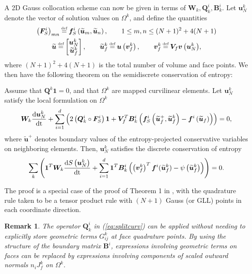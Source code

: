 \documentclass[review,onefignum,onetabnum,final]{siamart171218}
\newtheorem*{remark}{Remark}
\renewcommand{\tilde}{\widetilde}
\newcommand{\td}[2]{\frac{{\rm d}#1}{{\rm d}{\rm #2}}}
\newcommand{\LRp}[1]{\left( #1 \right)}
\newcommand\myeq{\mathrel{\stackrel{\makebox[0pt]{\mbox{\normalfont\tiny def}}}{=}}}
\begin{document}
A 2D Gauss collocation scheme can now be given in terms of $\bm{W}_k, \bm{Q}^i_k, \bm{B}^i_k$.   Let $\bm{u}^k_N$ denote the vector of solution values on $\Omega^k$, and define the quantities 
\begin{gather*}
\LRp{\bm{F}^i_S}_{mn} \myeq \bm{f}^i_S\LRp{\tilde{\bm{u}}_m,\tilde{\bm{u}}_n}, \qquad 1 \leq m,n \leq (N+1)^2 + 4(N+1) \\
\tilde{\bm{u}} \myeq \begin{bmatrix}
\bm{u}^k_N\\
\tilde{\bm{u}}^k_f
\end{bmatrix}, \qquad \tilde{\bm{u}}^k_f \myeq \bm{u}\LRp{\bm{v}^k_f}, \qquad 
\bm{v}^k_f \myeq {\bm{V}_f\bm{v}\LRp{\bm{u}^k_N}},
\end{gather*}
where $(N+1)^2 + 4(N+1)$ is the total number of volume and face points.  
We then have the following theorem on the semidiscrete conservation of entropy:
\begin{theorem}
\label{thm:esdg2d}
Assume that $\bm{Q}^k\bm{1} = 0$, and that $\Omega^k$ are mapped curvilinear elements.  Let $\bm{u}^k_N$ satisfy the local formulation on $\Omega^k$
\begin{equation}
{\bm{W}_k\td{\bm{u}^k_N}{t} + \sum_{i=1}^d \LRp{2\LRp{\bm{Q}^i_k\circ\bm{F}^i_S}\bm{1} + \bm{V}_f^T\bm{B}_k^i\LRp{\bm{f}^i_S\LRp{{\tilde{\bm{u}}_f}^+,\tilde{\bm{u}}^k_f}-\bm{f}^i\LRp{\tilde{\bm{u}}_f}}}} = 0, 
\end{equation}
where $\tilde{\bm{u}}^+$ denotes boundary values of the entropy-projected conservative variables on neighboring elements.  Then, $\bm{u}^k_N$ satisfies the discrete conservation of entropy 
\[
\sum_{k} \LRp{\bm{1}^T\bm{W}_k\td{S\LRp{\bm{u}^k_N}}{t} + \sum_{i=1}^d\bm{1}^T\bm{B}^i_k\LRp{\LRp{\bm{v}^k_f}^T\bm{f}^i(\tilde{\bm{u}}^k_f) - \psi\LRp{\tilde{\bm{u}}^k_f}}} = 0.
\]
\end{theorem}
The proof is a special case of the proof of Theorem 1 in \cite{chan2018discretely}, with the quadrature rule taken to be a tensor product rule with $(N+1)$ Gauss (or GLL) points in each coordinate direction.  

\begin{remark}
The operator $\bm{Q}^i_k$  in (\ref{eq:splitcurv}) can be applied without needing to explicitly store geometric terms $G^k_{ij}$ at face quadrature points.  By using the structure of the boundary matrix $\bm{B}^i$, expressions involving geometric terms on faces can be replaced by expressions involving components of scaled outward normals ${n}_i J^k_f$ on $\Omega^k$.  
\end{remark}
\end{document}
